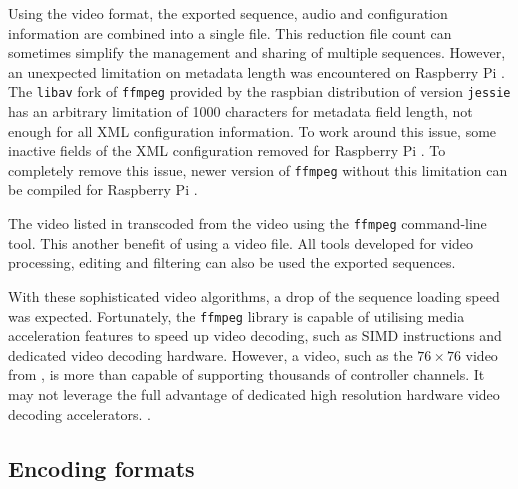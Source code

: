 Using the video format, the exported sequence, audio and configuration information are combined into a single file. This reduction  file count can sometimes simplify the management and sharing of multiple sequences. However, an unexpected limitation on metadata length was encountered on Raspberry Pi . The \texttt{libav} fork of \texttt{ffmpeg} provided by the raspbian distribution of version \texttt{jessie} has an arbitrary limitation of 1000 characters for metadata field length, not enough for all XML configuration information. To work around this issue, some inactive fields of the XML configuration  removed for Raspberry Pi . To completely remove this issue,  newer version of \texttt{ffmpeg} without this limitation can be compiled for Raspberry Pi .

The  video listed in   transcoded from the  video using the \texttt{ffmpeg} command-line tool. This  another benefit of using a video file. All tools developed for  video processing, editing and filtering can also be used  the exported sequences.

With these sophisticated video  algorithms, a drop of the sequence loading speed was expected. Fortunately, the \texttt{ffmpeg} library is capable of utilising media acceleration features to speed up video decoding, such as SIMD instructions and dedicated video decoding hardware. However, a  video, such as the $76 \times 76$ video from , is more than capable of supporting thousands of controller channels. It may not leverage the full advantage of dedicated high resolution hardware video decoding accelerators. .

\subsection{Encoding formats}

